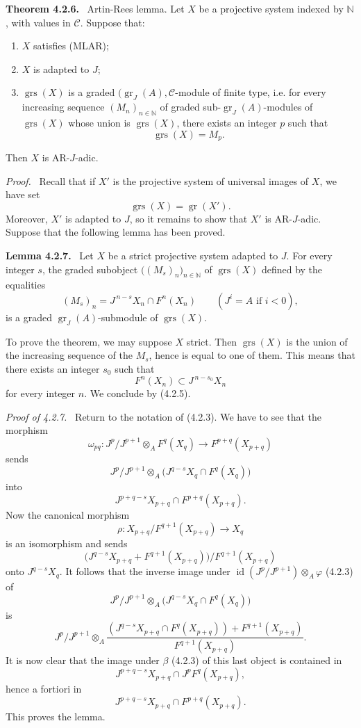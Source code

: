 \documentclass[11pt]{article}
\newenvironment{statement}[1]{\par\medskip\noindent\textbf{#1.}\ }{\par\medskip}
\newenvironment{prooftext}[1][Proof]{\par\noindent\emph{#1.}\ }{\par\medskip}
\providecommand{\gr}{\operatorname{gr}}
\providecommand{\id}{\operatorname{id}}
\providecommand{\id}{\operatorname{id}}
\providecommand{\gr}{\operatorname{gr}}
\providecommand{\gr}{\operatorname{gr}}
\providecommand{\grs}{\operatorname{grs}}
\providecommand{\id}{\operatorname{id}}
\providecommand{\id}{\operatorname{id}}
\providecommand{\id}{\operatorname{id}}
\providecommand{\id}{\operatorname{id}}
\begin{document}
\begin{statement}{Theorem 4.2.6}
Artin-Rees lemma. Let \(X\) be a projective system indexed by \(\mathbb N\), with values in \(\mathcal C\). Suppose that:
\begin{enumerate}[label=\textup{(\roman*)}]
\item \(X\) satisfies (MLAR);
\item \(X\) is adapted to \(J\);
\item \(\grs(X)\) is a graded \((\gr_J(A),\mathcal C\)-module of finite type, i.e. for every increasing sequence \((M_n)_{n\in\mathbb N}\) of graded sub-\(\gr_J(A)\)-modules of \(\grs(X)\) whose union is \(\grs(X)\), there exists an integer \(p\) such that
\[
\grs(X)=M_p.
\]
\end{enumerate}
Then \(X\) is AR-\(J\)-adic.
\end{statement}

\begin{prooftext}
Recall that if \(X'\) is the projective system of universal images of \(X\), we have set
\[
\grs(X)=\gr(X').
\]
Moreover, \(X'\) is adapted to \(J\), so it remains to show that \(X'\) is AR-\(J\)-adic. Suppose that the following lemma has been proved.
\end{prooftext}

\begin{statement}{Lemma 4.2.7}
Let \(X\) be a strict projective system adapted to \(J\). For every integer \(s\), the graded subobject \(\bigl((M_s)_n\bigr)_{n\in\mathbb N}\) of \(\grs(X)\) defined by the equalities
\[
(M_s)_n=J^{\,n-s}X_n\cap F^n(X_n)\qquad(J^i=A\text{ if }i<0),
\]
is a graded \(\gr_J(A)\)-submodule of \(\grs(X)\).
\end{statement}

To prove the theorem, we may suppose \(X\) strict. Then \(\grs(X)\) is the union of the increasing sequence of the \(M_s\), hence is equal to one of them. This means that there exists an integer \(s_0\) such that
\[
F^n(X_n)\subset J^{\,n-s_0}X_n
\]
for every integer \(n\). We conclude by (4.2.5).

\begin{prooftext}[Proof of 4.2.7]
Return to the notation of (4.2.3). We have to see that the morphism
\[
\omega_{pq}:J^p/J^{p+1}\otimes_A F^q(X_q)\longrightarrow F^{p+q}(X_{p+q})
\]
sends
\[
J^p/J^{p+1}\otimes_A
\bigl(J^{q-s}X_q\cap F^q(X_q)\bigr)
\]
into
\[
J^{p+q-s}X_{p+q}\cap F^{p+q}(X_{p+q}).
\]
Now the canonical morphism
\[
\rho:X_{p+q}/F^{q+1}(X_{p+q})\longrightarrow X_q
\]
is an isomorphism and sends
\[
\bigl(J^{q-s}X_{p+q}+F^{q+1}(X_{p+q})\bigr)/F^{q+1}(X_{p+q})
\]
onto \(J^{q-s}X_q\). It follows that the inverse image under
\(\id(J^p/J^{p+1})\otimes_A\varphi\) (4.2.3) of
\[
J^p/J^{p+1}\otimes_A
\bigl(J^{q-s}X_q\cap F^q(X_q)\bigr)
\]
is
\[
J^p/J^{p+1}\otimes_A
\frac{(J^{q-s}X_{p+q}\cap F^q(X_{p+q}))+F^{q+1}(X_{p+q})}
     {F^{q+1}(X_{p+q})}.
\]
It is now clear that the image under \(\beta\) (4.2.3) of this last object is contained in
\[
J^{p+q-s}X_{p+q}\cap J^pF^q(X_{p+q}),
\]
hence a fortiori in
\[
J^{p+q-s}X_{p+q}\cap F^{p+q}(X_{p+q}).
\]
This proves the lemma.
\end{prooftext}
\end{document}
